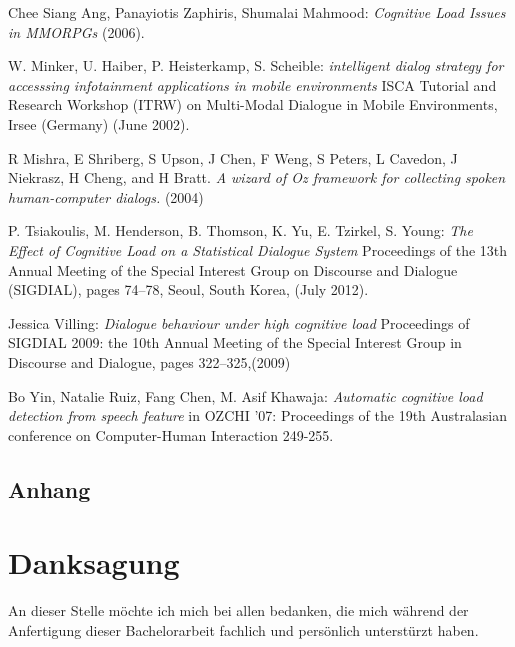 \documentclass[12pt,a4paper]{scrartcl}
\begin{document}
\begin{thebibliography}{Maron \& Ames, 1982}

	 Chee Siang Ang, Panayiotis Zaphiris, Shumalai Mahmood: \textit{Cognitive Load Issues in MMORPGs} 
(2006).

	 W. Minker, U. Haiber, P. Heisterkamp, S. 
Scheible: \textit{intelligent dialog strategy for accesssing infotainment applications in mobile 
environments} ISCA Tutorial and Research Workshop (ITRW) on Multi-Modal Dialogue in Mobile 
Environments, Irsee (Germany) (June 2002).

 R Mishra, E Shriberg, S Upson, J Chen, F Weng, S Peters,
L Cavedon, J Niekrasz, H Cheng, and H Bratt. \textit{A wizard of Oz framework for collecting spoken human-computer dialogs.} (2004)

	 P. Tsiakoulis, M. Henderson, B. Thomson, K. Yu, E. Tzirkel, S. Young: \textit{The Effect of Cognitive Load on a Statistical Dialogue System} Proceedings of the 13th Annual Meeting of the Special Interest Group on Discourse and Dialogue (SIGDIAL), pages 74–78,
Seoul, South Korea, (July 2012).

 Jessica Villing: \textit{Dialogue behaviour under high cognitive load} Proceedings of SIGDIAL 2009: the 10th Annual Meeting of the Special Interest Group in Discourse and Dialogue, pages 322–325,(2009)



 Bo Yin, Natalie Ruiz, Fang Chen, M. Asif Khawaja: \textit{Automatic cognitive load detection from speech feature} in OZCHI ’07: Proceedings of the 19th Australasian conference on Computer-Human Interaction 249-255. 



\end{thebibliography}


\begin{appendix}

\section{Anhang}

\end{appendix}
\cleardoublepage

\section*{Danksagung}
An dieser Stelle möchte ich mich bei allen bedanken, die mich während der Anfertigung dieser Bachelorarbeit fachlich und persönlich unterstürzt haben.\\
\end{document}
